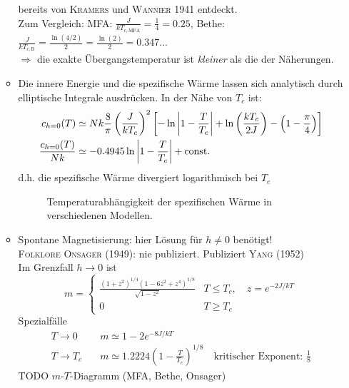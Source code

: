 \begin{enumerate}[A)]
\begin{itemize}
        bereits von \textsc{Kramers} und \textsc{Wannier} 1941 entdeckt. \\
        Zum Vergleich: MFA: $\frac{J}{k T_{c, \text{MFA}}} = \frac{1}{4} = 0.25$, Bethe: $\frac{J}{k T_{c, \text{B}}} = \frac{\ln(4/2)}{2} = \frac{\ln(2)}{2}=0.347\ldots$ \\
        $\Rightarrow$ die exakte Übergangstemperatur ist \emph{kleiner} als die der Näherungen.
        \item Die innere Energie und die spezifische Wärme lassen sich analytisch durch elliptische Integrale ausdrücken. In der Nähe von $T_c$ ist:
        \begin{equation}
            \begin{split}
                c_{h=0}(T) &\simeq N k \frac{8}{\pi} \left( \frac{J}{k T_c} \right)^2 \left[ - \ln \left| 1 - \frac{T}{T_c} \right|+ \ln \left( \frac{k T_c}{2 J} \right) - \left( 1 - \frac{\pi}{4} \right)  \right] \\
                \frac{c_{h=0}(T)}{N k} &\simeq -0.4945 \ln \left| 1 - \frac{T}{T_c} \right| + \text{const.}
            \end{split}
        \end{equation}
        d.h. die spezifische Wärme divergiert logarithmisch bei $T_c$ 
        \begin{figure}[H]
        \centering
        \def\svgwidth{0.5\textwidth}
        
        \caption{Temperaturabhängigkeit der spezifischen Wärme in verschiedenen Modellen.}
        \label{img:C_T_MFA_Bethe_Onsager}
\end{figure}
        \item Spontane Magnetisierung: hier Lösung für $h \neq 0$ benötigt! \\
        \textsc{Folklore Onsager} (1949): nie publiziert. Publiziert \textsc{Yang} (1952) \\
        Im Grenzfall $h \to 0$ ist
        \begin{equation}
            m =
            \begin{cases}
                \frac{ \left( 1+z^2 \right)^{1/4} \left( 1 - 6z^2 + z^4 \right)^{1/8}}{\sqrt{1-z^2}} & T \leq T_c, \quad z = e^{-2J / k T} \\
                0 & T \geq T_c
            \end{cases}
        \end{equation}
        Spezialfälle\\
        \begin{equation}
            \begin{split}
                T \to 0 \quad &m \simeq 1 - 2 e^{-8 J / k T} \\
                T \to T_c \quad &m \simeq 1.2224 (1- \frac{T}{T_c})^{1/8} \quad \text{kritischer Exponent: } \frac{1}{8}
            \end{split}
        \end{equation}
        TODO $m$-$T$-Diagramm (MFA, Bethe, Onsager) %
    \end{itemize}
\end{enumerate}

